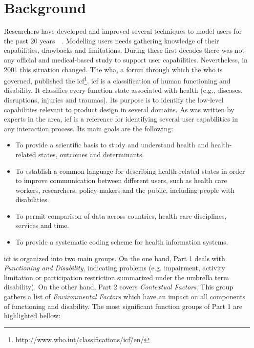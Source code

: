\section{Background}
\label{sec:background}

Researchers have developed and improved several techniques to model users for 
the past 20 years~\citep{petrelli_user_centered_1999}~\citep{fink_adaptable_1997}. 
Modelling users needs gathering knowledge of their capabilities, drawbacks 
and limitations. During these first decades there was not any official and 
medical-based study to support user capabilities. Nevertheless, in 2001 
this situation changed. The \ac{wha}, a forum through which the \ac{who} is
governed, published the \ac{icf}\footnote{http://www.who.int/classifications/icf/en/}. 
\ac{icf} is a classification of human functioning and disability. It 
classifies every function state associated with health (e.g., diseases, 
disruptions, injuries and traumas). Its purpose is to identify the low-level 
capabilities relevant to product design in several domains. As was written by 
experts in the area, \ac{icf} is a reference for identifying several user 
capabilities in any interaction process. Its main goals are the following:

\begin{itemize}
  \item To provide a scientific basis to study and understand health and
  health-related states, outcomes and determinants.
  \item To establish a common language for describing health-related states in 
  order to improve communication between different users, such as health care 
  workers, researchers, policy-makers and the public, including people with 
  disabilities.
  \item To permit comparison of data across countries, health care disciplines,
  services and time.
  \item To provide a systematic coding scheme for health information systems.
\end{itemize}

\ac{icf} is organized into two main groups. On the one hand, Part 1 deals with 
\textit{Functioning and Disability}, indicating problems (e.g. impairment, 
activity limitation or participation restriction summarized under the umbrella 
term disability). On the other hand, Part 2 covers \textit{Contextual Factors}. 
This group gathers a list of \textit{Environmental Factors} which have an impact 
on all components of functioning and disability. The most significant function
groups of Part 1 are highlighted bellow:

